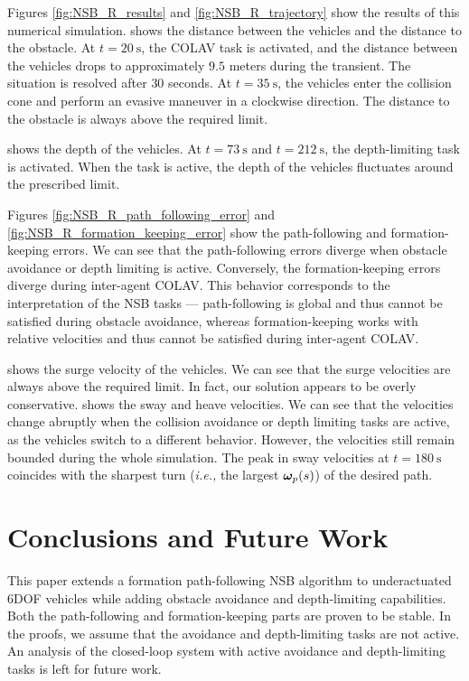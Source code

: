 Figures \ref{fig:NSB_R_results} and \ref{fig:NSB_R_trajectory} show the results of this numerical simulation.
 shows the distance between the vehicles and the distance to the obstacle.
At $t = \SI{20}{\second}$, the COLAV task is activated, and the distance between the vehicles drops to approximately $9.5$ meters during the transient.
The situation is resolved after $30$ seconds.
At $t = \SI{35}{\second}$, the vehicles enter the collision cone and perform an evasive maneuver in a clockwise direction.
The distance to the obstacle is always above the required limit.



 shows the depth of the vehicles.
At $t = \SI{73}{\second}$ and $t = \SI{212}{\second}$, the depth-limiting task is activated.
When the task is active, the depth of the vehicles fluctuates around the prescribed limit.



Figures \ref{fig:NSB_R_path_following_error} and \ref{fig:NSB_R_formation_keeping_error} show the path-following and formation-keeping errors.
We can see that the path-following errors diverge when obstacle avoidance or depth limiting is active.
Conversely, the formation-keeping errors diverge during inter-agent COLAV.
This behavior corresponds to the interpretation of the NSB tasks --- path-following is global and thus cannot be satisfied during obstacle avoidance, whereas formation-keeping works with relative velocities and thus cannot be satisfied during inter-agent COLAV.



 shows the surge velocity of the vehicles.
We can see that the surge velocities are always above the required limit.
In fact, our solution appears to be overly conservative.
 shows the sway and heave velocities.
We can see that the velocities change abruptly when the collision avoidance or depth limiting tasks are active, as the vehicles switch to a different behavior.
However, the velocities still remain bounded during the whole simulation.
The peak in sway velocities at $t = \SI{180}{\second}$ coincides with the sharpest turn (\emph{i.e.,} the largest $\bm{\omega}_p(s)$) of the desired path.


\section{Conclusions and Future Work}
\label{sec:NSB_R_conclusion}

This paper extends a formation path-following NSB algorithm to underactuated 6DOF vehicles while adding obstacle avoidance and depth-limiting capabilities. 
Both the path-following and formation-keeping parts are proven to be stable.     
In the proofs, we assume that the avoidance and depth-limiting tasks are not active.
An analysis of the closed-loop system with active avoidance and depth-limiting tasks is left for future work.
